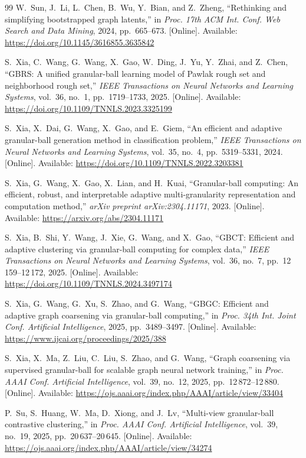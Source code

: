 \documentclass[conference]{IEEEtran}
\begin{document}
\begin{thebibliography}{99}
W.~Sun, J.~Li, L.~Chen, B.~Wu, Y.~Bian, and Z.~Zheng, ``Rethinking and simplifying bootstrapped graph latents,'' in \emph{Proc. 17th ACM Int. Conf. Web Search and Data Mining}, 2024, pp.~665--673. [Online]. Available: \url{https://doi.org/10.1145/3616855.3635842}

S.~Xia, C.~Wang, G.~Wang, X.~Gao, W.~Ding, J.~Yu, Y.~Zhai, and Z.~Chen, ``{GBRS}: A unified granular-ball learning model of Pawlak rough set and neighborhood rough set,'' \emph{IEEE Transactions on Neural Networks and Learning Systems}, vol.~36, no.~1, pp.~1719--1733, 2025. [Online]. Available: \url{https://doi.org/10.1109/TNNLS.2023.3325199}

S.~Xia, X.~Dai, G.~Wang, X.~Gao, and E.~Giem, ``An efficient and adaptive granular-ball generation method in classification problem,'' \emph{IEEE Transactions on Neural Networks and Learning Systems}, vol.~35, no.~4, pp.~5319--5331, 2024. [Online]. Available: \url{https://doi.org/10.1109/TNNLS.2022.3203381}

S.~Xia, G.~Wang, X.~Gao, X.~Lian, and H.~Kuai, ``Granular-ball computing: An efficient, robust, and interpretable adaptive multi-granularity representation and computation method,'' \emph{arXiv preprint arXiv:2304.11171}, 2023. [Online]. Available: \url{https://arxiv.org/abs/2304.11171}

S.~Xia, B.~Shi, Y.~Wang, J.~Xie, G.~Wang, and X.~Gao, ``{GBCT}: Efficient and adaptive clustering via granular-ball computing for complex data,'' \emph{IEEE Transactions on Neural Networks and Learning Systems}, vol.~36, no.~7, pp.~12\,159--12\,172, 2025. [Online]. Available: \url{https://doi.org/10.1109/TNNLS.2024.3497174}

S.~Xia, G.~Wang, G.~Xu, S.~Zhao, and G.~Wang, ``{GBGC}: Efficient and adaptive graph coarsening via granular-ball computing,'' in \emph{Proc. 34th Int. Joint Conf. Artificial Intelligence}, 2025, pp.~3489--3497. [Online]. Available: \url{https://www.ijcai.org/proceedings/2025/388}

S.~Xia, X.~Ma, Z.~Liu, C.~Liu, S.~Zhao, and G.~Wang, ``Graph coarsening via supervised granular-ball for scalable graph neural network training,'' in \emph{Proc. AAAI Conf. Artificial Intelligence}, vol.~39, no.~12, 2025, pp.~12\,872--12\,880. [Online]. Available: \url{https://ojs.aaai.org/index.php/AAAI/article/view/33404}

P.~Su, S.~Huang, W.~Ma, D.~Xiong, and J.~Lv, ``Multi-view granular-ball contrastive clustering,'' in \emph{Proc. AAAI Conf. Artificial Intelligence}, vol.~39, no.~19, 2025, pp.~20\,637--20\,645. [Online]. Available: \url{https://ojs.aaai.org/index.php/AAAI/article/view/34274}


\end{thebibliography}
\end{document}
